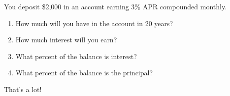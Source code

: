 
\begin{stmt}
You deposit \$2,000 in an account earning 3\% APR compounded monthly.
\begin{enumerate}[label=(\alph*), leftmargin=2em, topsep=2pt, itemsep=1pt]
\item How much will you have in the account in 20 years?
\item How much interest will you earn?
\item What percent of the balance is interest?
\item What percent of the balance is the principal?
\end{enumerate}
\end{stmt}

\begin{sol}
 


 


 


That's a lot!

 

\end{sol}



